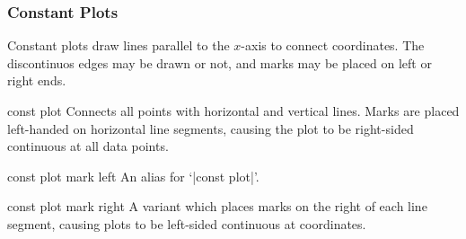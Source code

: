 \subsubsection{Constant Plots}
Constant plots draw lines parallel to the $x$-axis to connect coordinates. The discontinuos edges may be drawn or not, and marks may be placed on left or right ends.

\begin{plottype}{const plot}
Connects all points with horizontal and vertical lines. Marks are placed left-handed on horizontal line segments, causing the plot to be right-sided continuous at all data points.

\begin{codeexample}[]
\end{codeexample}


\begin{codeexample}[]
\end{codeexample}
\end{plottype}

\begin{plottype}{const plot mark left}
An alias for `|const plot|'.
\end{plottype}

\begin{plottype}{const plot mark right}
 A variant which places marks on the right of each line segment, causing plots to be left-sided continuous at coordinates.
\begin{codeexample}[]
\end{codeexample}
\end{plottype}

